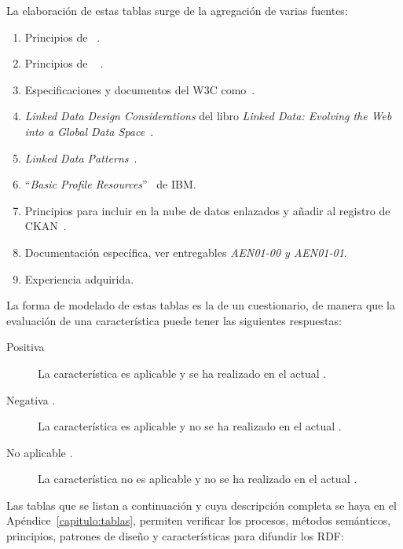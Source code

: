 La elaboración de estas tablas surge de la agregación de varias fuentes:
\begin{enumerate}
 \item Principios de \linkeddata~\cite{Berners-Lee-2006}.
 \item Principios de \opendata~\cite{okfn} . 
 \item Especificaciones y documentos del \gls{W3C} como~\cite{publishing-ogd,linked-data-cookbook,Berr08}. 
 \item \textit{Linked Data Design Considerations} del libro \textit{Linked Data: Evolving the Web into a Global Data Space}~\cite{Heath_Bizer_2011}.
 \item \textit{Linked Data Patterns}~\cite{linked-data-patterns}.
 \item ``\textit{Basic Profile Resources}''~\cite{basic-profile-ibm} de IBM.
 \item Principios para incluir \datasets en la nube de datos enlazados y añadir al registro de \gls{CKAN}~\cite{ckanValidator}.
 \item Documentación específica, ver entregables \textit{AEN01-00 y AEN01-01}.
 \item Experiencia adquirida.
\end{enumerate}

La forma de modelado de estas tablas es la de un cuestionario, de manera que la evaluación de una característica 
puede tener las siguientes respuestas:
\begin{description}
 \item [Positiva \si.] La característica es aplicable y se ha realizado en el actual \dataset.
 \item [Negativa \no.] La característica es aplicable y no se ha realizado en el actual \dataset.
 \item [No aplicable \na.] La característica no es aplicable y no se ha realizado en el actual \dataset.
\end{description}

Las tablas que se listan a continuación y cuya descripción completa se haya en el Apéndice~\ref{capitulo:tablas}, permiten verificar los 
procesos, métodos semánticos, principios, patrones de diseño y características para difundir los \datasets \gls{RDF}:

